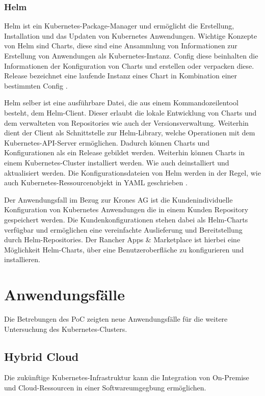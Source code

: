 \subsubsection{Helm}
Helm ist ein Kubernetes-Package-Manager und ermöglicht die Erstellung, Installation und das Updaten von Kubernetes Anwendungen.
Wichtige Konzepte von Helm sind Charts, diese sind eine Ansammlung von Informationen zur Erstellung von Anwendungen als Kubernetes-Instanz. 
Config diese beinhalten die Informationen der Konfiguration von Charts und erstellen oder verpacken diese.
Release bezeichnet eine laufende Instanz eines Chart in Kombination einer bestimmten Config \cite{helm}.

Helm selber ist eine ausführbare Datei, die aus einem Kommandozeilentool besteht, dem Helm-Client.
Dieser erlaubt die lokale Entwicklung von Charts und dem verwalteten von Repositories wie auch der Versionsverwaltung.
Weiterhin dient der Client als Schnittstelle zur Helm-Library, welche Operationen mit dem Kubernetes-API-Server ermöglichen.
Dadurch können Charts und Konfigurationen als ein Release gebildet werden.
Weiterhin können Charts in einem Kubernetes-Cluster installiert werden.
Wie auch deinstalliert und aktualisiert werden. 
Die Konfigurationsdateien von Helm werden in der Regel, wie auch Kubernetes-Ressourcenobjekt in YAML geschrieben \cite{helm}.

Der Anwendungsfall im Bezug zur Krones AG ist die Kundenindividuelle Konfiguration von Kubernetes Anwendungen die in einem Kunden Repository gespeichert werden.
Die Kundenkonfigurationen stehen dabei als Helm-Charts verfügbar und ermöglichen eine vereinfachte Auslieferung und Bereitstellung durch Helm-Repositories.
Der Rancher Apps \& Marketplace ist hierbei eine Möglichkeit Helm-Charts, über eine Benutzeroberfläche zu konfigurieren und installieren.


\section{Anwendungsfälle}
Die Betrebungen des PoC zeigten neue Anwendungsfälle für die weitere Untersuchung des Kubernetes-Clusters.

\subsection{Hybrid Cloud}
Die zukünftige Kubernetes-Infrastruktur kann die Integration von On-Premise und Cloud-Ressourcen in einer Softwareumgegbung ermöglichen.



